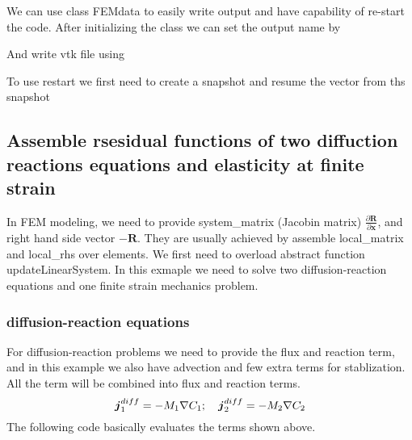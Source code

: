 We can use class {\ttfamily F\+E\+Mdata} to easily write output and have capability of re-\/start the code. After initializing the class we can set the output name by 
\begin{DoxyCode}{0}
\end{DoxyCode}
 And write vtk file using 
\begin{DoxyCode}{0}
\end{DoxyCode}
 To use restart we first need to create a snapshot and resume the vector from ths snapshot 
\begin{DoxyCode}{0}
\end{DoxyCode}
 \hypertarget{brain_morph_assemble}{}\subsection{Assemble rsesidual functions of two diffuction reactions equations and elasticity at finite strain}\label{brain_morph_assemble}
In F\+EM modeling, we need to provide system\+\_\+matrix (Jacobin matrix) $\frac{\partial \boldsymbol{R}}{\partial \boldsymbol{x}} $, and right hand side vector $-\boldsymbol{R}$. They are usually achieved by assemble {\ttfamily local\+\_\+matrix} and {\ttfamily local\+\_\+rhs} over elements. We first need to overload abstract function {\ttfamily update\+Linear\+System}. In this exmaple we need to solve two diffusion-\/reaction equations and one finite strain mechanics problem. \hypertarget{brain_morph_DRq}{}\subsubsection{diffusion-\/reaction equations}\label{brain_morph_DRq}
For diffusion-\/reaction problems we need to provide the flux and reaction term, and in this example we also have advection and few extra terms for stablization. All the term will be combined into {\ttfamily flux} and {\ttfamily reaction} terms. \[ \boldsymbol{j}_1^{diff}=-M_1\nabla C_\text{1}; \quad \boldsymbol{j}_2^{diff}=-M_2\nabla C_\text{2}\\ \] The following code basically evaluates the terms shown above. 

